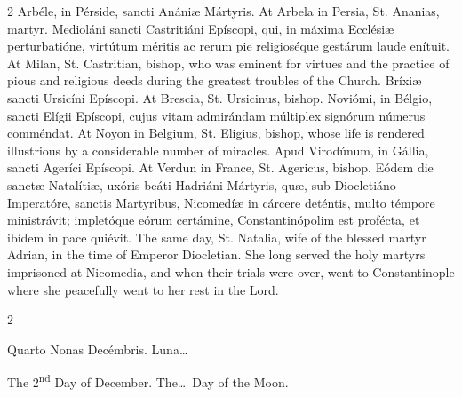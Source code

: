 \begin{paracol}{2}
\switchcolumn*
{}
Arbéle, in Pérside, 
 sancti Anániæ Mártyris.
\switchcolumn
{}
At Arbela in Persia, St. Ananias, 
 martyr.
\switchcolumn*
{}
Medioláni sancti 
 Castritiáni Epíscopi, qui, in máxima Ecclésiæ perturbatióne, virtútum 
 méritis ac rerum pie religioséque gestárum laude enítuit.
\switchcolumn
{}
At Milan, St. Castritian, bishop, 
 who was eminent for virtues and the practice of pious and religious deeds 
 during the greatest troubles of the Church.
\switchcolumn*
{}
Bríxiæ sancti Ursicíni 
 Epíscopi.
\switchcolumn
{}
At Brescia, St. Ursicinus, bishop.
\switchcolumn*
{}
Noviómi, in Bélgio, 
 sancti Elígii Epíscopi, cujus vitam admirándam múltiplex signórum númerus 
 comméndat.
\switchcolumn
{}
At Noyon in Belgium, St. Eligius, 
 bishop, whose life is rendered illustrious by a considerable number of 
 miracles.
\switchcolumn*
{}
Apud Virodúnum, in 
 Gállia, sancti Ageríci Epíscopi.
\switchcolumn
{}
At Verdun in France, St. Agericus, 
 bishop.
\switchcolumn*
{}
Eódem die sanctæ 
 Natalítiæ, uxóris beáti Hadriáni Mártyris, quæ, sub Diocletiáno Imperatóre, 
 sanctis Martyribus, Nicomedíæ in cárcere deténtis, multo témpore ministrávit; 
 impletóque eórum certámine, Constantinópolim est profécta, et ibídem in pace 
 quiévit.
\switchcolumn
{}
The same day, St. Natalia, wife of 
 the blessed martyr Adrian, in the time of Emperor Diocletian. She long 
 served the holy martyrs imprisoned at Nicomedia, and when their trials were 
 over, went to Constantinople where she peacefully went to her rest in the 
 Lord.
\switchcolumn*
{}
\end{paracol}



\begin{paracol}{2}
\begin{center}{\color{gregoriocolor} Quarto Nonas Decémbris. 
 Luna\dots\ }\end{center}
\switchcolumn
{}
\begin{center}{\color{gregoriocolor} The 
 2\textsuperscript{nd} Day of 
 December. The\dots\ Day of the Moon.}\end{center}
\end{paracol}

